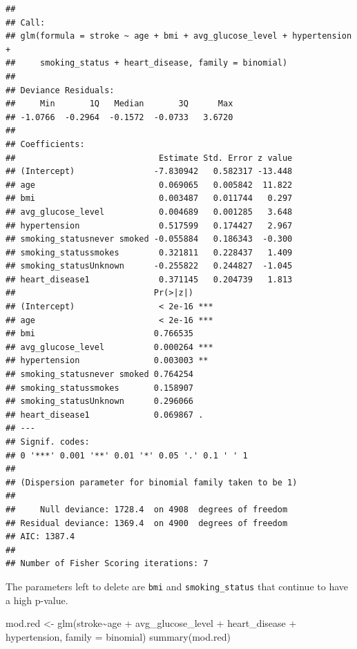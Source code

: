 \documentclass[
]{article}
\newenvironment{Shaded}{\begin{snugshade}}{\end{snugshade}}
\newcommand{\AttributeTok}[1]{\textcolor[rgb]{0.77,0.63,0.00}{#1}}
\newcommand{\FunctionTok}[1]{\textcolor[rgb]{0.00,0.00,0.00}{#1}}
\newcommand{\NormalTok}[1]{#1}
\newcommand{\OtherTok}[1]{\textcolor[rgb]{0.56,0.35,0.01}{#1}}
\newcommand{\SpecialCharTok}[1]{\textcolor[rgb]{0.00,0.00,0.00}{#1}}
\begin{document}
\begin{verbatim}
## 
## Call:
## glm(formula = stroke ~ age + bmi + avg_glucose_level + hypertension + 
##     smoking_status + heart_disease, family = binomial)
## 
## Deviance Residuals: 
##     Min       1Q   Median       3Q      Max  
## -1.0766  -0.2964  -0.1572  -0.0733   3.6720  
## 
## Coefficients:
##                             Estimate Std. Error z value
## (Intercept)                -7.830942   0.582317 -13.448
## age                         0.069065   0.005842  11.822
## bmi                         0.003487   0.011744   0.297
## avg_glucose_level           0.004689   0.001285   3.648
## hypertension                0.517599   0.174427   2.967
## smoking_statusnever smoked -0.055884   0.186343  -0.300
## smoking_statussmokes        0.321811   0.228437   1.409
## smoking_statusUnknown      -0.255822   0.244827  -1.045
## heart_disease1              0.371145   0.204739   1.813
##                            Pr(>|z|)    
## (Intercept)                 < 2e-16 ***
## age                         < 2e-16 ***
## bmi                        0.766535    
## avg_glucose_level          0.000264 ***
## hypertension               0.003003 ** 
## smoking_statusnever smoked 0.764254    
## smoking_statussmokes       0.158907    
## smoking_statusUnknown      0.296066    
## heart_disease1             0.069867 .  
## ---
## Signif. codes:  
## 0 '***' 0.001 '**' 0.01 '*' 0.05 '.' 0.1 ' ' 1
## 
## (Dispersion parameter for binomial family taken to be 1)
## 
##     Null deviance: 1728.4  on 4908  degrees of freedom
## Residual deviance: 1369.4  on 4900  degrees of freedom
## AIC: 1387.4
## 
## Number of Fisher Scoring iterations: 7
\end{verbatim}

The parameters left to delete are \texttt{bmi} and
\texttt{smoking\_status} that continue to have a high p-value. 

\begin{Shaded}
\begin{Highlighting}[]
\NormalTok{mod.red }\OtherTok{\textless{}{-}} \FunctionTok{glm}\NormalTok{(stroke}\SpecialCharTok{\textasciitilde{}}\NormalTok{age }\SpecialCharTok{+}\NormalTok{ avg\_glucose\_level }\SpecialCharTok{+}\NormalTok{ heart\_disease }\SpecialCharTok{+}\NormalTok{ hypertension, }
               \AttributeTok{family =}\NormalTok{ binomial)}
\FunctionTok{summary}\NormalTok{(mod.red)}
\end{Highlighting}
\end{Shaded}
\end{document}
